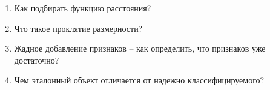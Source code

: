 \documentclass[12pt] {article}
\begin{document}
\begin{enumerate}
\item \begin{minipage}[t]{0.65\linewidth}
      Как подбирать функцию расстояния? 
   \end{minipage}%
\vspace{10mm}
\item Что такое проклятие размерности?
\vspace{10mm}
\item Жадное добавление признаков -- как определить, что признаков уже достаточно?
\vspace{10mm}
\item Чем эталонный объект отличается от надежно классифицируемого?

\end{enumerate}
\end{document}
